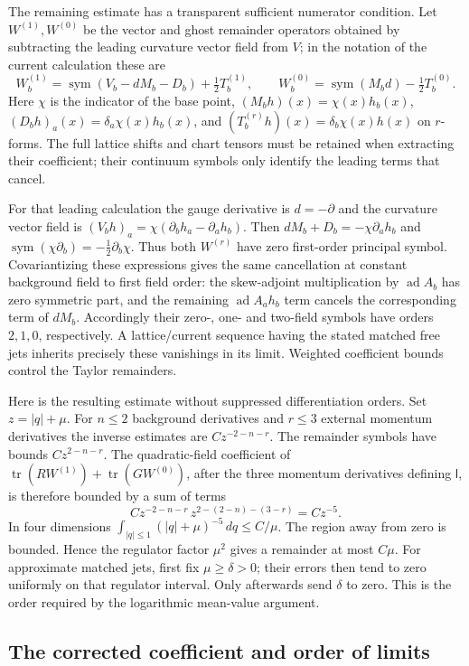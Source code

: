 The remaining estimate has a transparent sufficient numerator condition.
Let $W^{(1)},W^{(0)}$ be the vector and ghost remainder operators obtained
by subtracting the leading curvature vector field from $V$; in the
notation of the current calculation these are
\[
 W_b^{(1)}=\operatorname{sym}(V_b-dM_b-D_b)+\tfrac12T_b^{(1)},
 \qquad W_b^{(0)}=\operatorname{sym}(M_bd)-\tfrac12T_b^{(0)}.
\]
Here $\chi$ is the indicator of the base point,
$(M_bh)(x)=\chi(x)h_b(x)$,
$(D_bh)_a(x)=\delta_a\chi(x)h_b(x)$, and
$(T_b^{(r)}h)(x)=\delta_b\chi(x)h(x)$ on $r$-forms.
The full lattice shifts and chart tensors must be retained when
extracting their coefficient; their continuum symbols only identify
the leading terms that cancel.

For that leading calculation the gauge derivative is $d=-\partial$
and the curvature vector field is
$(V_bh)_a=\chi(\partial_bh_a-\partial_ah_b)$.
Then $dM_b+D_b=-\chi\partial_ah_b$ and
$\operatorname{sym}(\chi\partial_b)=-\frac12\partial_b\chi$.
Thus both $W^{(r)}$ have zero first-order principal symbol. Covariantizing
these expressions gives the same cancellation at constant background field
to first field order: the skew-adjoint multiplication by
$\operatorname{ad}A_b$ has zero symmetric part, and the remaining
$\operatorname{ad}A_a h_b$ term cancels the corresponding term of $dM_b$.
Accordingly their zero-, one- and two-field symbols have orders
$2,1,0$, respectively. A lattice/current sequence having the stated
matched free jets inherits precisely these vanishings in its limit.
Weighted coefficient bounds control the Taylor remainders.

Here is the resulting estimate without suppressed differentiation orders.
Set $z=|q|+\mu$. For $n\le2$ background derivatives and $r\le3$ external
momentum derivatives the inverse estimates are
$Cz^{-2-n-r}$. The remainder symbols have bounds
$Cz^{2-n-r}$. The quadratic-field coefficient of
$\operatorname{tr}(RW^{(1)})+\operatorname{tr}(GW^{(0)})$, after the
three momentum derivatives defining $\mathsf l$, is therefore bounded
by a sum of terms
\[
 Cz^{-2-n-r}\,z^{2-(2-n)-(3-r)}=Cz^{-5}.
\]
In four dimensions
$\int_{|q|\le1}(|q|+\mu)^{-5}\,dq\le C/\mu$.
The region away from zero is bounded. Hence the regulator factor
$\mu^2$ gives a remainder at most $C\mu$.
For approximate matched jets, first fix $\mu\ge\delta>0$; their
errors then tend to zero uniformly on that regulator interval.
Only afterwards send $\delta$ to zero. This is the order required
by the logarithmic mean-value argument.

\subsection{The corrected coefficient and order of limits}
\label{ch17:regulator-completion}

